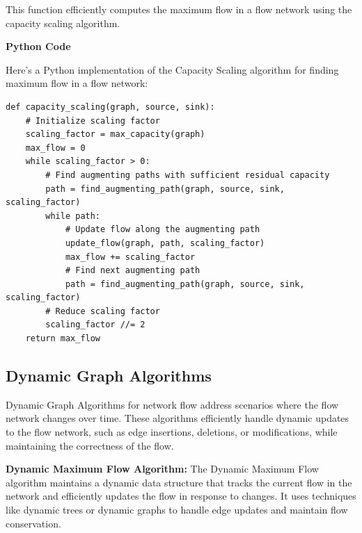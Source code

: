 \documentclass[12pt]{book} %
\begin{document}
This function efficiently computes the maximum flow in a flow network using the capacity scaling algorithm.

\textbf{Python Code}


Here's a Python implementation of the Capacity Scaling algorithm for finding maximum flow in a flow network:
\FloatBarrier
\begin{lstlisting}
def capacity_scaling(graph, source, sink):
    # Initialize scaling factor
    scaling_factor = max_capacity(graph)
    max_flow = 0
    while scaling_factor > 0:
        # Find augmenting paths with sufficient residual capacity
        path = find_augmenting_path(graph, source, sink, scaling_factor)
        while path:
            # Update flow along the augmenting path
            update_flow(graph, path, scaling_factor)
            max_flow += scaling_factor
            # Find next augmenting path
            path = find_augmenting_path(graph, source, sink, scaling_factor)
        # Reduce scaling factor
        scaling_factor //= 2
    return max_flow
\end{lstlisting}
\FloatBarrier

\subsection{Dynamic Graph Algorithms}

Dynamic Graph Algorithms for network flow address scenarios where the flow network changes over time. These algorithms efficiently handle dynamic updates to the flow network, such as edge insertions, deletions, or modifications, while maintaining the correctness of the flow.

\textbf{Dynamic Maximum Flow Algorithm:}
The Dynamic Maximum Flow algorithm maintains a dynamic data structure that tracks the current flow in the network and efficiently updates the flow in response to changes. It uses techniques like dynamic trees or dynamic graphs to handle edge updates and maintain flow conservation.
\end{document}
